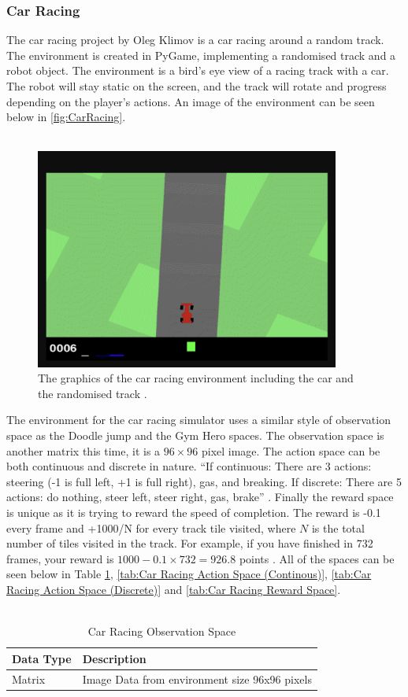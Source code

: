 \documentclass[a4paper,12pt]{article}
\begin{document}
\subsubsection{Car Racing}
The car racing project by Oleg Klimov is a car racing around a random track. The environment is created in PyGame, implementing a randomised track and a robot object. The environment is a bird's eye view of a racing track with a car. The robot will stay static on the screen, and the track will rotate and progress depending on the player's actions. An image of the environment can be seen below in \autoref{fig:CarRacing}.
\\\\
\begin{figure}[H]
\centering
\includegraphics[width=10cm]{imgs/CarRacing.png}
\caption{The graphics of the car racing environment including the car and the randomised track \cite{Klimov}.}
\label{fig:CarRacing}
\end{figure}
\noindent
The environment for the car racing simulator uses a similar style of observation space as the Doodle jump and the Gym Hero spaces. The observation space is another matrix this time, it is a $96\times96$ pixel image. The action space can be both continuous and discrete in nature. ``If continuous: There are 3 actions: steering (-1 is full left, +1 is full right), gas, and breaking. If discrete: There are 5 actions: do nothing, steer left, steer right, gas, brake'' \cite{Klimov}. Finally the reward space is unique as it is trying to reward the speed of completion. The reward is -0.1 every frame and +1000/N for every track tile visited, where $N$ is the total number of tiles visited in the track. For example, if you have finished in 732 frames, your reward is $1000 - 0.1\times732 = 926.8$ points \cite{Klimov}. All of the spaces can be seen below in Table \ref{tab:Car Racing Observation Space}, \ref{tab:Car Racing Action Space (Continous)}, \ref{tab:Car Racing Action Space (Discrete)} and \ref{tab:Car Racing Reward Space}.
\\\\
\begin{table}[H]
\centering
\caption{Car Racing Observation Space}
\label{tab:Car Racing Observation Space}
\begin{tabular}{|ll|}
\hline
\textbf{Data Type} & \textbf{Description}\\ \hline
Matrix & Image Data from environment size 96x96 pixels\\ \hline
\end{tabular}
\end{table}
\end{document}

